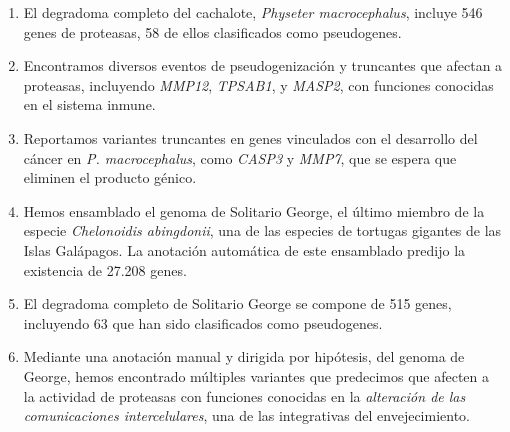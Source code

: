 \begin{enumerate}
    \item El degradoma completo del cachalote, \textit{Physeter macrocephalus}, incluye 546 genes de proteasas, 58 de ellos clasificados como pseudogenes.
    \item Encontramos diversos eventos de pseudogenizaci\'{o}n y truncantes que afectan a proteasas, incluyendo \textit{MMP12}, \textit{TPSAB1}, y \textit{MASP2}, con funciones conocidas en el sistema inmune.
    \item Reportamos variantes truncantes en genes vinculados con el desarrollo del cáncer en \emph{P. macrocephalus}, como \textit{CASP3} y \textit{MMP7}, que se espera que eliminen el producto g\'{e}nico.
    \item Hemos ensamblado el genoma de Solitario George, el \'{u}ltimo miembro de la especie \textit{Chelonoidis abingdonii}, una de las especies de tortugas gigantes de las Islas Gal\'{a}pagos. La anotación automática de este ensamblado predijo la existencia de 27.208 genes.
    \item El degradoma completo de Solitario George se compone de 515 genes, incluyendo 63 que han sido clasificados como pseudogenes.
    \item Mediante una anotación manual y dirigida por hipótesis, del genoma de George, hemos encontrado múltiples variantes que predecimos que afecten a la actividad de proteasas con funciones conocidas en la \emph{alteración de las comunicaciones intercelulares}, una de las  integrativas del envejecimiento.
\end{enumerate}
